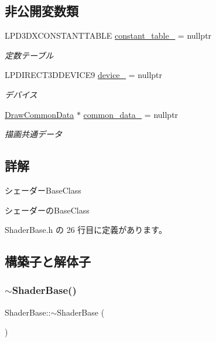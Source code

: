 \subsection*{非公開変数類}
\begin{DoxyCompactItemize}
\item 
L\+P\+D3\+D\+X\+C\+O\+N\+S\+T\+A\+N\+T\+T\+A\+B\+LE \mbox{\hyperlink{class_shader_base_a9b6b2a5920dd57ac463040224fb64b68}{constant\+\_\+table\+\_\+}} = nullptr
\begin{DoxyCompactList}\small\item\em 定数テーブル \end{DoxyCompactList}\item 
L\+P\+D\+I\+R\+E\+C\+T3\+D\+D\+E\+V\+I\+C\+E9 \mbox{\hyperlink{class_shader_base_a15e4a4c1c1148433b9a0c60a7c32a366}{device\+\_\+}} = nullptr
\begin{DoxyCompactList}\small\item\em デバイス \end{DoxyCompactList}\item 
\mbox{\hyperlink{class_draw_common_data}{Draw\+Common\+Data}} $\ast$ \mbox{\hyperlink{class_shader_base_a35b31a286a2d5df521f504e3d883da02}{common\+\_\+data\+\_\+}} = nullptr
\begin{DoxyCompactList}\small\item\em 描画共通データ \end{DoxyCompactList}\end{DoxyCompactItemize}


\subsection{詳解}
シェーダー\+Base\+Class 

シェーダーの\+Base\+Class 

 Shader\+Base.\+h の 26 行目に定義があります。



\subsection{構築子と解体子}
\mbox{\label{class_shader_base_a3b7c2337128ca825093ab3a47bce4084}} 
\subsubsection{\texorpdfstring{$\sim$\+Shader\+Base()}{~ShaderBase()}}
{\footnotesize\ttfamily Shader\+Base\+::$\sim$\+Shader\+Base (\begin{DoxyParamCaption}{ }\end{DoxyParamCaption})\hspace{0.3cm}{\ttfamily [pure virtual]}}



